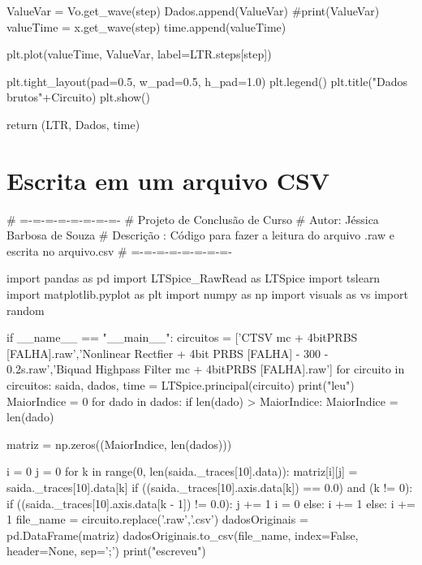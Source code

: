             ValueVar = Vo.get_wave(step)
            Dados.append(ValueVar)
            #print(ValueVar)
            valueTime = x.get_wave(step)
            time.append(valueTime)



            plt.plot(valueTime, ValueVar, label=LTR.steps[step])

         
        plt.tight_layout(pad=0.5, w_pad=0.5, h_pad=1.0)
        plt.legend()
        plt.title("Dados brutos"+Circuito)
        plt.show()
		
        
        return (LTR, Dados, time)




\section{\textbf{Escrita em um arquivo CSV}}
\label{sec:CapLTspice}

# =-=-=-=-=-=-=-=-
# Projeto de Conclusão de Curso
# Autor: Jéssica Barbosa de Souza
# Descrição : Código para fazer a leitura do arquivo .raw e escrita no arquivo.csv
# =-=-=-=-=-=-=-=-

import pandas as pd
import LTSpice_RawRead as LTSpice
import tslearn
import matplotlib.pyplot as plt
import numpy as np
import visuals as vs
import random


if __name__ == "__main__":
    circuitos = ['CTSV mc + 4bitPRBS [FALHA].raw','Nonlinear Rectfier + 4bit PRBS [FALHA] - 300 - 0.2s.raw','Biquad Highpass Filter mc + 4bitPRBS [FALHA].raw']
    for circuito in circuitos:
        saida,  dados, time = LTSpice.principal(circuito)
        print("leu")
        MaiorIndice = 0
        for dado in dados:
            if len(dado) > MaiorIndice:
                MaiorIndice = len(dado)


        matriz = np.zeros((MaiorIndice, len(dados)))

        i = 0
        j = 0
        for k in range(0, len(saida._traces[10].data)):
            matriz[i][j] = saida._traces[10].data[k]
            if ((saida._traces[10].axis.data[k]) == 0.0) and (k != 0):
                if ((saida._traces[10].axis.data[k - 1]) != 0.0):
                    j += 1
                    i = 0
                else:
                    i += 1
            else:
                i += 1
        file_name = circuito.replace('.raw','.csv')
        dadosOriginais = pd.DataFrame(matriz)
        dadosOriginais.to_csv(file_name, index=False, header=None, sep=';')
        print("escreveu")








